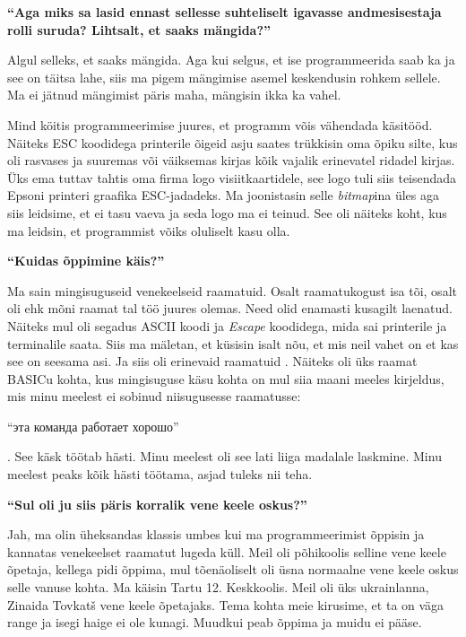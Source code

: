\textbf{\enquote{Aga miks sa lasid ennast sellesse suhteliselt igavasse andmesisestaja rolli suruda? Lihtsalt, et saaks mängida?}}

Algul selleks, et saaks mängida. Aga kui selgus, et ise programmeerida saab ka ja see on täitsa lahe, siis ma pigem mängimise asemel keskendusin rohkem sellele. Ma ei jätnud mängimist päris maha, mängisin ikka ka vahel. 

Mind köitis programmeerimise juures, et programm võis vähendada käsitööd. Näiteks ESC koodidega printerile õigeid asju saates trükkisin oma õpiku silte, kus oli rasvases ja suuremas või väiksemas kirjas kõik vajalik erinevatel ridadel  kirjas. Üks ema tuttav tahtis oma firma logo visiitkaartidele, see logo tuli siis teisendada Epsoni printeri graafika ESC-jadadeks. Ma joonistasin selle \emph{bitmap}ina üles aga siis leidsime, et ei tasu vaeva ja seda logo ma ei teinud. See oli näiteks koht, kus ma leidsin, et programmist võiks oluliselt kasu olla. 

\textbf{\enquote{Kuidas õppimine käis?}}

Ma sain mingisuguseid venekeelseid raamatuid. Osalt raamatukogust isa tõi, osalt oli ehk mõni raamat tal töö juures olemas.  Need olid enamasti kusagilt laenatud. Näiteks mul oli segadus ASCII koodi ja \emph{Escape} koodidega, mida sai printerile ja terminalile saata. Siis ma mäletan, et küsisin isalt nõu, et mis neil vahet on et kas see on seesama asi. Ja siis oli erinevaid raamatuid . Näiteks oli üks raamat BASICu kohta, kus mingisuguse käsu kohta on mul siia maani meeles kirjeldus, mis minu meelest ei sobinud niisugusesse raamatusse: \begin{russian}\enquote{эта команда работает хорошо}\end{russian}. See käsk töötab hästi. Minu meelest oli see lati liiga madalale laskmine. Minu meelest peaks kõik hästi töötama, asjad tuleks nii teha. 

\textbf{\enquote{Sul oli ju siis päris korralik vene keele oskus?}}

Jah, ma olin üheksandas klassis umbes kui ma programmeerimist õppisin ja kannatas venekeelset raamatut lugeda küll. Meil oli põhikoolis selline vene keele õpetaja, kellega pidi õppima, mul tõenäoliselt oli üsna normaalne vene keele oskus selle vanuse kohta. Ma käisin Tartu 12. Keskkoolis. Meil oli üks ukrainlanna, Zinaida Tovkatš vene keele õpetajaks. Tema kohta meie kirusime, et ta on väga range ja isegi haige ei ole kunagi. Muudkui peab õppima ja muidu ei pääse. 

